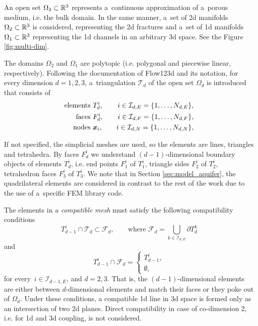An open set $\Omega_{3} \subset {\mathbb{R}}^3$ represents a~continuous approximation of a~porous medium, i.e. the bulk domain.
In the same manner, a~set of 2d manifolds $\Omega_2 \subset {\mathbb{R}}^3$ is considered, representing the 2d fractures
and a~set of 1d manifolds $\Omega_1 \subset {\mathbb{R}}^3$ representing the 1d channels in an arbitrary 3d space.
See the Figure \ref{fig:multi-dim}.


The domains $\Omega_2$ and $\Omega_1$ are polytopic (i.e. polygonal and piecewise linear, respectively).
Following the documentation of Flow123d \cite{flow123d_doc_2015} and its notation,
for every dimension $d=1,2,3$, a~triangulation $\mathcal{T}_{d}$ of the open set $\Omega_d$
is introduced that consists of
\begin{eqnarray}
    \textrm{elements } & T_{d}^{i}, & \quad i \in\mathcal{I}_{d,E} = \{1,\dots,N_{d,E} \}, \nonumber\\
    \textrm{faces }    & F_{d}^{i}, & \quad i \in\mathcal{I}_{d,F} = \{1,\dots,N_{d,F} \}, \\
    \textrm{nodes }    & \mathbf{\boldsymbol{x}}_{i}, & \quad i \in\mathcal{I}_{d,N} = \{1,\dots,N_{d,N} \}, \nonumber
\end{eqnarray}

If not specified, the simplicial meshes are used, so the elements are lines, triangles and tetrahedra.
By faces $F^i_d$ we understand $(d-1)$-dimensional boundary objects of elements $T_d^i$,
i.e. end points $F^i_1$ of $T^i_1$, triangle sides $F^i_2$ of $T^i_2$, tetrahedron faces $F^i_3$ of $T^i_3$.
We note that in Section \ref{sec:model_aquifer}, the quadrilateral elements are considered in contrast to the rest of the work
due to the use of a~specific FEM library code.


The elements in \emph{a compatible mesh} must satisfy the following compatibility conditions
\begin{equation}
        T_{d-1}^i \cap \mathcal{T}_d \subset \mathcal{F}_d,  \qquad \text{where } \mathcal{F}_d = \bigcup_{k\in\mathcal{I}_{d,E}} \partial T_{d}^{k}
\end{equation}
and
\begin{equation}
        T_{d-1}^i \cap \mathcal{F}_d = 
        \begin{cases}
            T_{d-1}^i, \\
            \emptyset,
        \end{cases}
\end{equation}
for every $\,i\in\mathcal{I}_{d-1,E}$, and $d=2,3$. 
That is, the $(d-1)$-dimensional elements are either between $d$-dimensional elements and
match their faces or they poke out of $\Omega_d$. 
Under these conditions, a compatible 1d line in 3d space is formed only as an intersection of 
two 2d planes.
Direct compatibility in case of co-dimension 2, i.e. for 1d and 3d coupling, is not considered.


